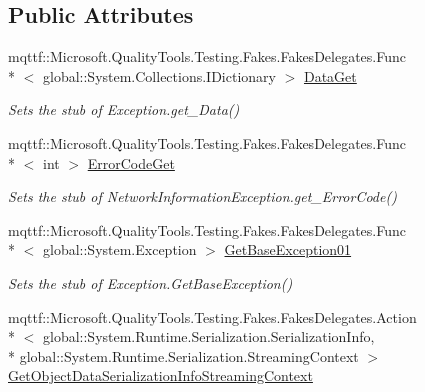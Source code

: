 \subsection*{Public Attributes}
\begin{DoxyCompactItemize}
\item 
mqttf\-::\-Microsoft.\-Quality\-Tools.\-Testing.\-Fakes.\-Fakes\-Delegates.\-Func\\*
$<$ global\-::\-System.\-Collections.\-I\-Dictionary $>$ \hyperlink{class_system_1_1_net_1_1_network_information_1_1_fakes_1_1_stub_network_information_exception_a6a80133f776520a99a18b0cf3c89f651}{Data\-Get}
\begin{DoxyCompactList}\small\item\em Sets the stub of Exception.\-get\-\_\-\-Data()\end{DoxyCompactList}\item 
mqttf\-::\-Microsoft.\-Quality\-Tools.\-Testing.\-Fakes.\-Fakes\-Delegates.\-Func\\*
$<$ int $>$ \hyperlink{class_system_1_1_net_1_1_network_information_1_1_fakes_1_1_stub_network_information_exception_aefd6aac3e98b2b425485b1013c2d8c06}{Error\-Code\-Get}
\begin{DoxyCompactList}\small\item\em Sets the stub of Network\-Information\-Exception.\-get\-\_\-\-Error\-Code()\end{DoxyCompactList}\item 
mqttf\-::\-Microsoft.\-Quality\-Tools.\-Testing.\-Fakes.\-Fakes\-Delegates.\-Func\\*
$<$ global\-::\-System.\-Exception $>$ \hyperlink{class_system_1_1_net_1_1_network_information_1_1_fakes_1_1_stub_network_information_exception_a40b1cad79b1215add053fd43b653cdf6}{Get\-Base\-Exception01}
\begin{DoxyCompactList}\small\item\em Sets the stub of Exception.\-Get\-Base\-Exception()\end{DoxyCompactList}\item 
mqttf\-::\-Microsoft.\-Quality\-Tools.\-Testing.\-Fakes.\-Fakes\-Delegates.\-Action\\*
$<$ global\-::\-System.\-Runtime.\-Serialization.\-Serialization\-Info, \\*
global\-::\-System.\-Runtime.\-Serialization.\-Streaming\-Context $>$ \hyperlink{class_system_1_1_net_1_1_network_information_1_1_fakes_1_1_stub_network_information_exception_aae6ac5d11a333febe8f89344efdbff2e}{Get\-Object\-Data\-Serialization\-Info\-Streaming\-Context}

\end{DoxyCompactItemize}
